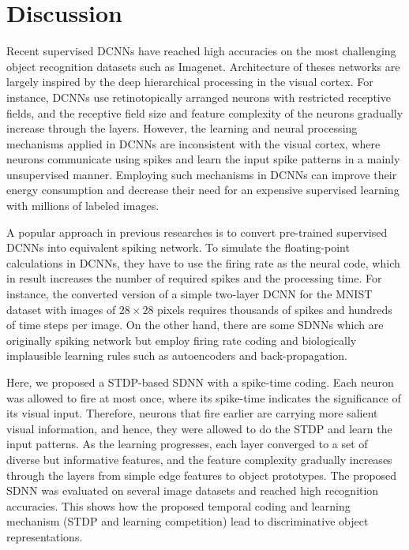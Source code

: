 \documentclass[preprint,5p,12pt,twocolumn]{article}
\begin{document}
\section*{Discussion}
Recent supervised DCNNs have reached high accuracies on the most challenging object recognition datasets such as Imagenet. Architecture of theses networks are largely inspired by the deep hierarchical processing in the visual cortex. For instance, DCNNs  use retinotopically arranged neurons with restricted receptive fields, and the receptive field size and feature complexity of the neurons gradually increase through the layers. However, the learning and neural processing mechanisms applied in DCNNs are inconsistent with the visual cortex, where neurons communicate using spikes and learn the input spike patterns in a mainly unsupervised manner. Employing such mechanisms in DCNNs can improve their energy consumption and decrease their need for an expensive supervised learning with millions of labeled images.

A popular approach in previous researches is to convert pre-trained supervised DCNNs into equivalent spiking network. To simulate the floating-point calculations in DCNNs, they  have to use the firing rate as the neural code, which in result increases the number of required spikes and the processing time. For instance, the converted version of a simple two-layer DCNN for the MNIST dataset with images of $28 \times 28$ pixels requires thousands of spikes and hundreds of time steps per image. On the other hand, there are some SDNNs \cite{panda2016unsupervised,burbank2015mirrored,bengio2015towards} which are originally spiking network but employ firing rate coding and  biologically implausible learning rules such as autoencoders and back-propagation.

Here, we proposed a STDP-based SDNN with a spike-time coding. Each neuron was allowed to fire at most once, where its spike-time indicates the significance of its visual input. Therefore, neurons that fire earlier are carrying more salient visual information, and hence, they were allowed to do the STDP and learn the input patterns. As the learning progresses, each layer converged to a set of diverse but informative features, and the feature complexity gradually increases through the layers from simple edge features to object prototypes. The proposed SDNN was evaluated on several image datasets and reached high recognition accuracies. This shows how the proposed temporal coding and learning mechanism (STDP and learning competition) lead to  discriminative object representations. 
\end{document}
